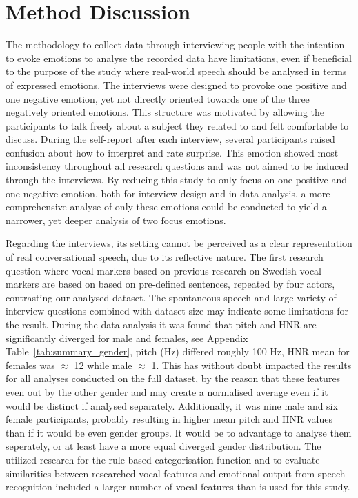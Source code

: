\section{Method Discussion}

The methodology to collect data through interviewing people with the intention to evoke emotions to analyse the recorded data have limitations, even if beneficial to the purpose of the study where real-world speech should be analysed in terms of expressed emotions. The interviews were designed to provoke one positive and one negative emotion, yet not directly oriented towards one of the three negatively oriented emotions. This structure was motivated by allowing the participants to talk freely about a subject they related to and felt comfortable to discuss. During the self-report after each interview, several participants raised confusion about how to interpret and rate surprise. This emotion showed most inconsistency throughout all research questions and was not aimed to be induced through the interviews. By reducing this study to only focus on one positive and one negative emotion, both for interview design and in data analysis, a more comprehensive analyse of only these emotions could be conducted to yield a narrower, yet deeper analysis of two focus emotions. 

\medskip
Regarding the interviews, its setting cannot be perceived as a clear representation of real conversational speech, due to its reflective nature. The first research question where vocal markers based on previous research on Swedish vocal markers are based on based on pre-defined sentences, repeated by four actors, contrasting our analysed dataset. The spontaneous speech and large variety of interview questions combined with dataset size may indicate some limitations for the result. During the data analysis it was found that pitch and HNR are significantly diverged for male and females, see Appendix Table~\ref{tab:summary_gender}, pitch (Hz) differed roughly 100 Hz, HNR mean for females was $\approx$ 12 while male $\approx$ 1. This has without doubt impacted the results for all analyses conducted on the full dataset, by the reason that these features even out by the other gender and may create a normalised average even if it would be distinct if analysed separately. 
Additionally, it was nine male and six female participants, probably resulting in higher mean pitch and HNR values than if it would be even gender groups. It would be to advantage to analyse them seperately, or at least have a more equal diverged gender distribution. The utilized research for the rule-based categorisation function and to evaluate similarities between researched vocal features and emotional output from speech recognition included a larger number of vocal features than is used for this study. 

